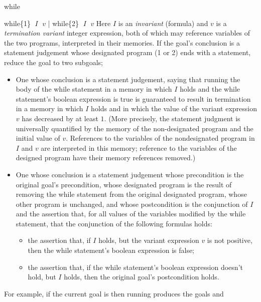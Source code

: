 \begin{tactic}{while}
  \begin{tsyntax}{while\{1\} $\;I$ $\;v$ | while\{2\} $\;I$ $\;v$}
    Here $I$ is an \emph{invariant} (formula) and $v$ is a
    \emph{termination variant} integer expression, both of which may reference
    variables of the two programs, interpreted in their memories.  If
    the goal's conclusion is a \prhl statement judgement whose
    designated program (1 or 2) ends with a  statement,
    reduce the goal to two subgoals;
    \begin{itemize}
    \item One whose conclusion is a \phl statement judgement, saying that
      running the body of the while statement in a memory in which
      $I$ holds and the while statement's boolean expression is true
      is guaranteed to result in termination in a memory in which
      $I$ holds and in which the value of the variant expression $v$
      has decreased by at least $1$. (More precisely, the \phl statement
      judgment is universally quantified by the memory of the non-designated
      program and the initial value of $v$. References to the variables
      of the nondesignated program in $I$ and $v$ are interpreted in this
      memory; reference to the variables of the designed program have
      their memory references removed.)

    \item One whose conclusion is a \prhl statement judgement whose
      precondition is the original goal's precondition, whose
      designated program is the result of removing the while statement
      from the original designated program, whose other program is
      unchanged, and whose postcondition is the conjunction of $I$ and
      the assertion that, for all values of the variables modified by
      the while statement, that the conjunction of the following
      formulas holds:
      \begin{itemize}
      \item the assertion that, if $I$ holds, but the variant
        expression $v$ is not positive, then the while statement's
        boolean expression is false;

      \item the assertion that, if the while statement's boolean expression
        doesn't hold, but $I$ holds, then the original goal's postcondition
        holds.
      \end{itemize}
    \end{itemize}

  \bigskip
  For example, if the current goal is
   then
  running 
  produces the goals
  and
  \end{tsyntax}


\end{tactic}
